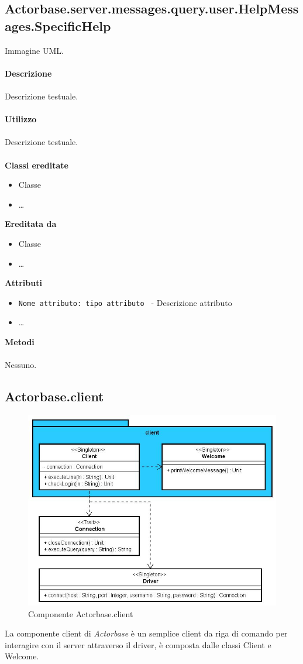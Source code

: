 \documentclass[a4paper]{article}
\begin{document}
	\subsection{Actorbase.server.messages.query.user.HelpMessages.SpecificHelp}
		Immagine UML.
		\\ \\
		\textbf{Descrizione}
			\\ \\
			Descrizione testuale.
			\\ \\
		\textbf{Utilizzo}
			\\ \\
			Descrizione testuale.
			\\ \\
		\textbf{Classi ereditate}
			\begin{itemize}
				\item Classe
				\item \dots
			\end{itemize}
		\textbf{Ereditata da}
			\begin{itemize}
				\item Classe
				\item \dots
			\end{itemize}
		\textbf{Attributi}
			\begin{itemize}
				\item \texttt{Nome attributo: tipo attributo } - Descrizione attributo
				\item \dots
			\end{itemize}
		\textbf{Metodi}
			\\ \\
			Nessuno.	
			
	\subsection{Actorbase.client}
		\begin{figure}[H]
			\centering
			\includegraphics[scale=0.5]{Client/clientLevel.jpg}
			\caption{Componente Actorbase.client}
		\end{figure}
		La componente client di \emph{Actorbase} è un semplice client da riga di comando per interagire con il server attraverso il driver, è composta dalle classi Client e Welcome.
	
\end{document}
